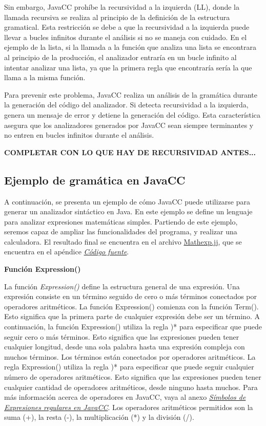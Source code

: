 Sin embargo, JavaCC prohíbe la recursividad a la izquierda (LL), donde la llamada recursiva se realiza al principio de la definición de la estructura gramatical. Esta restricción se debe a que la recursividad a la izquierda puede llevar a bucles infinitos durante el análisis si no se maneja con cuidado. En el ejemplo de la lista, si la llamada a la función que analiza una lista se encontrara al principio de la producción, el analizador entraría en un bucle infinito al intentar analizar una lista, ya que la primera regla que encontraría sería la que llama a la misma función.

Para prevenir este problema, JavaCC realiza un análisis de la gramática durante la generación del código del analizador. Si detecta recursividad a la izquierda, genera un mensaje de error y detiene la generación del código. Esta característica asegura que los analizadores generados por JavaCC sean siempre terminantes y no entren en bucles infinitos durante el análisis.

\textbf{COMPLETAR CON LO QUE HAY DE RECURSIVIDAD ANTES...}


\subsection{Ejemplo de gramática en JavaCC}
\noindent A continuación, se presenta un ejemplo de cómo JavaCC puede utilizarse para generar un analizador sintáctico en Java. En este ejemplo se define un lenguaje para analizar expresiones matemáticas simples. Partiendo de este ejemplo, seremos capaz de ampliar las funcionalidades del programa, y realizar una calculadora. El resultado final se encuentra en el archivo \hyperref[sec:mathexp]{Mathexp.jj}, que se encuentra en el apéndice \hyperref[sec:codigofuente]{\textit{Código fuente}}.

\phantom{text}

\noindent \textbf{Función Expression()}

\phantom{text}

\lstset{inputencoding=utf8/latin1}


\noindent La función \textit{Expression()} define la estructura general de una expresión. Una expresión consiste en un término seguido de cero o más términos conectados por operadores aritméticos. La función Expression() comienza con la función Term(). Esto significa que la primera parte de cualquier expresión debe ser un término. A continuación, la función Expression() utiliza la regla )* para especificar que puede seguir cero o más términos. Esto significa que las expresiones pueden tener cualquier longitud, desde una sola palabra hasta una expresión compleja con muchos términos.
Los términos están conectados por operadores aritméticos. La regla Expression() utiliza la regla )* para especificar que puede seguir cualquier número de operadores aritméticos. Esto significa que las expresiones pueden tener cualquier cantidad de operadores aritméticos, desde ninguno hasta muchos. Para más información acerca de operadores en JavaCC, vaya al anexo \hyperref[sec:simbolosdeexpresionesregulares]{\textit{Símbolos de Expresiones regulares en JavaCC}}.
Los operadores aritméticos permitidos son la suma (+), la resta (-), la multiplicación (*) y la división (/).

